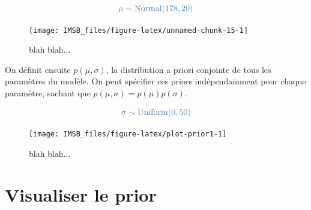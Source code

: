 \documentclass[
  a4paper,11pt,twoside,onecolumn,openright,final,oldfontcommands]{memoir}
\theoremstyle{definition}
\theoremstyle{definition}
\theoremstyle{definition}
\theoremstyle{definition}
\theoremstyle{remark}
\begin{document}
\[\color{steelblue}{\mu \sim \mathrm{Normal}(178,20)}\]

\begin{figure}[!htb]

{\centering \texttt{[image: IMSB\_files/figure-latex/unnamed-chunk-15-1]} 

}

\caption{blah blah...}\label{fig:unnamed-chunk-15}
\end{figure}

On définit ensuite \(p(\mu,\sigma)\), la distribution a priori conjointe de tous les paramètres du modèle. On peut spécifier ces priors indépendamment pour chaque paramètre, sachant que \(p(\mu, \sigma) = p(\mu) p(\sigma)\).

\[\color{steelblue}{\sigma \sim \mathrm{Uniform}(0,50)}\]

\begin{figure}[!htb]

{\centering \texttt{[image: IMSB\_files/figure-latex/plot-prior1-1]} 

}

\caption{blah blah...}\label{fig:plot-prior1}
\end{figure}

\hypertarget{visualiser-le-prior}{%
\section{Visualiser le prior}\label{visualiser-le-prior}}
\end{document}
